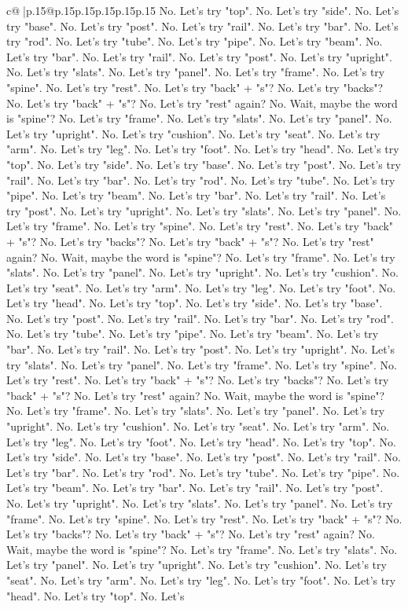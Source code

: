 \documentclass{article}
\begin{document}
{\begin{supertabular}{c@{$\;$}|p{.15\linewidth}@{}p{.15\linewidth}p{.15\linewidth}p{.15\linewidth}p{.15\linewidth}p{.15\linewidth}}
{{{No. Let's try "top". No. Let's try "side". No. Let's try "base". No. Let's try "post". No. Let's try "rail". No. Let's try "bar". No. Let's try "rod". No. Let's try "tube". No. Let's try "pipe". No. Let's try "beam". No. Let's try "bar". No. Let's try "rail". No. Let's try "post". No. Let's try "upright". No. Let's try "slats". No. Let's try "panel". No. Let's try "frame". No. Let's try "spine". No. Let's try "rest". No. Let's try "back" + "s"? No. Let's try "backs"? No. Let's try "back" + "s"? No. Let's try "rest" again? No. Wait, maybe the word is "spine"? No. Let's try "frame". No. Let's try "slats". No. Let's try "panel". No. Let's try "upright". No. Let's try "cushion". No. Let's try "seat". No. Let's try "arm". No. Let's try "leg". No. Let's try "foot". No. Let's try "head". No. Let's try "top". No. Let's try "side". No. Let's try "base". No. Let's try "post". No. Let's try "rail". No. Let's try "bar". No. Let's try "rod". No. Let's try "tube". No. Let's try "pipe". No. Let's try "beam". No. Let's try "bar". No. Let's try "rail". No. Let's try "post". No. Let's try "upright". No. Let's try "slats". No. Let's try "panel". No. Let's try "frame". No. Let's try "spine". No. Let's try "rest". No. Let's try "back" + "s"? No. Let's try "backs"? No. Let's try "back" + "s"? No. Let's try "rest" again? No. Wait, maybe the word is "spine"? No. Let's try "frame". No. Let's try "slats". No. Let's try "panel". No. Let's try "upright". No. Let's try "cushion". No. Let's try "seat". No. Let's try "arm". No. Let's try "leg". No. Let's try "foot". No. Let's try "head". No. Let's try "top". No. Let's try "side". No. Let's try "base". No. Let's try "post". No. Let's try "rail". No. Let's try "bar". No. Let's try "rod". No. Let's try "tube". No. Let's try "pipe". No. Let's try "beam". No. Let's try "bar". No. Let's try "rail". No. Let's try "post". No. Let's try "upright". No. Let's try "slats". No. Let's try "panel". No. Let's try "frame". No. Let's try "spine". No. Let's try "rest". No. Let's try "back" + "s"? No. Let's try "backs"? No. Let's try "back" + "s"? No. Let's try "rest" again? No. Wait, maybe the word is "spine"? No. Let's try "frame". No. Let's try "slats". No. Let's try "panel". No. Let's try "upright". No. Let's try "cushion". No. Let's try "seat". No. Let's try "arm". No. Let's try "leg". No. Let's try "foot". No. Let's try "head". No. Let's try "top". No. Let's try "side". No. Let's try "base". No. Let's try "post". No. Let's try "rail". No. Let's try "bar". No. Let's try "rod". No. Let's try "tube". No. Let's try "pipe". No. Let's try "beam". No. Let's try "bar". No. Let's try "rail". No. Let's try "post". No. Let's try "upright". No. Let's try "slats". No. Let's try "panel". No. Let's try "frame". No. Let's try "spine". No. Let's try "rest". No. Let's try "back" + "s"? No. Let's try "backs"? No. Let's try "back" + "s"? No. Let's try "rest" again? No. Wait, maybe the word is "spine"? No. Let's try "frame". No. Let's try "slats". No. Let's try "panel". No. Let's try "upright". No. Let's try "cushion". No. Let's try "seat". No. Let's try "arm". No. Let's try "leg". No. Let's try "foot". No. Let's try "head". No. Let's try "top". No. Let's }}}
\end{supertabular}}
\end{document}
